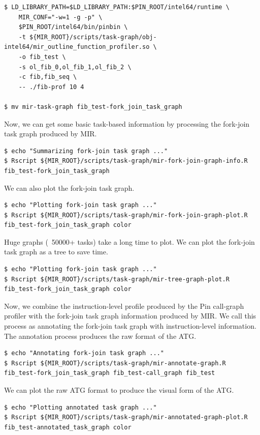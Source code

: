\documentclass[11pt,a4paper,notitlepage]{article}
\begin{document}
\begin{lstlisting}[style=BashInputStyle]
$ LD_LIBRARY_PATH=$LD_LIBRARY_PATH:$PIN_ROOT/intel64/runtime \
    MIR_CONF="-w=1 -g -p" \
    $PIN_ROOT/intel64/bin/pinbin \
    -t ${MIR_ROOT}/scripts/task-graph/obj-intel64/mir_outline_function_profiler.so \
    -o fib_test \
    -s ol_fib_0,ol_fib_1,ol_fib_2 \
    -c fib,fib_seq \
    -- ./fib-prof 10 4

$ mv mir-task-graph fib_test-fork_join_task_graph
\end{lstlisting}

Now, we can get some basic task-based information by processing the fork-join task graph produced by MIR.
\begin{lstlisting}[style=BashInputStyle]
$ echo "Summarizing fork-join task graph ..."
$ Rscript ${MIR_ROOT}/scripts/task-graph/mir-fork-join-graph-info.R fib_test-fork_join_task_graph 
\end{lstlisting}

We can also plot the fork-join task graph. 
\begin{lstlisting}[style=BashInputStyle]
$ echo "Plotting fork-join task graph ..."
$ Rscript ${MIR_ROOT}/scripts/task-graph/mir-fork-join-graph-plot.R fib_test-fork_join_task_graph color
\end{lstlisting}

Huge graphs (~50000+ tasks) take a long time to plot. We can plot the fork-join task graph as a tree to save time.
\begin{lstlisting}[style=BashInputStyle]
$ echo "Plotting fork-join task graph ..."
$ Rscript ${MIR_ROOT}/scripts/task-graph/mir-tree-graph-plot.R fib_test-fork_join_task_graph color
\end{lstlisting}

Now, we combine the instruction-level profile produced by the Pin call-graph profiler with the fork-join task graph information produced by MIR. We call this process as annotating the fork-join task graph with instruction-level information. The annotation process produces the raw format of the ATG.

\begin{lstlisting}[style=BashInputStyle]
$ echo "Annotating fork-join task graph ..."
$ Rscript ${MIR_ROOT}/scripts/task-graph/mir-annotate-graph.R fib_test-fork_join_task_graph fib_test-call_graph fib_test
\end{lstlisting}

We can plot the raw ATG format to produce the visual form of the ATG.
\begin{lstlisting}[style=BashInputStyle]
$ echo "Plotting annotated task graph ..."
$ Rscript ${MIR_ROOT}/scripts/task-graph/mir-annotated-graph-plot.R fib_test-annotated_task_graph color
\end{lstlisting}
\end{document}
